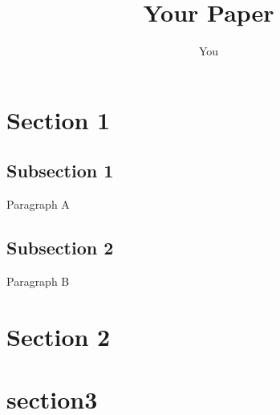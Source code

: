 \documentclass{article}
\title{Your Paper}
\author{You}
\begin{document}
\maketitle

\section{Section 1}

\subsection{Subsection 1}
Paragraph A

\subsection{Subsection 2}
Paragraph B

\section{Section 2}

\section{section3}
\end{document}
